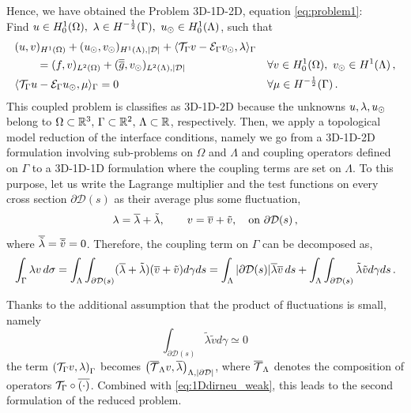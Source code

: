 \documentclass[r]{siamart171218}
\begin{document}
Hence, we have obtained the Problem 3D-1D-2D, equation 
\eqref{eq:problem1}: \\
Find $u \in H^1_0(\Omega), \ \lambda \in H^{-\frac 1 2}(\Gamma ),\ u_{\odot} \in H^1_0(\Lambda)$, such that
\begin{subequations}
\begin{align*}
&(u,v)_{H^1(\Omega)} + (u_{\odot},v_{\odot})_{H^1(\Lambda),|\mathcal{D}|} 
+ \langle {\mathcal{T}_\Gamma} v  - \mathcal{E}_\Gamma v_{\odot}, \lambda \rangle_\Gamma &&
\\
\nonumber
&\qquad= (f,v)_{L^2(\Omega)} +  (\overline{\overline{g}},v_{\odot})_{L^2(\Lambda),|\mathcal{D}|}
\quad &&\forall v \in H^1_0(\Omega), \ v_{\odot} \in H^1(\Lambda)\,,
\\
& \langle {\mathcal{T}_\Gamma} u - \mathcal{E}_\Gamma u_{\odot} , \mu \rangle_\Gamma = 0
\quad && \forall \mu \in H^{-\frac 1 2}(\Gamma)\,.
\end{align*}
\end{subequations}
This coupled problem is classifies as 3D-1D-2D because the unknowns $u,\lambda,u_{\odot}$ belong to 
$\Omega \subset \mathbb{R}^3,\, \Gamma \subset \mathbb{R}^2,\, \Lambda \subset \mathbb{R}$, respectively.
Then, we apply a topological model reduction of the interface conditions, namely we go from a 3D-1D-2D formulation
involving sub-problems on $\Omega$ and $\Lambda$ and coupling operators defined on $\Gamma$
to a 3D-1D-1D formulation where the coupling terms are set on $\Lambda$. 
To this purpose, let us write the Lagrange multiplier and the test functions on every cross section $\partial\mathcal{D}(s)$ as their average plus some fluctuation,
\begin{equation*}
\lambda=\overline{\lambda}+\tilde{\lambda}, \qquad v=\overline{v}+\tilde{v},
\quad \text{on} \ \partial\mathcal{D}(s)\,,
\end{equation*}
where $\overline{\tilde{\lambda}}=\overline{\tilde{v}}=0$. 
Therefore, the coupling term on $\Gamma$ can be decomposed as,
\begin{equation*}
\int_{\Gamma}\lambda v\, d\sigma
=\int _{\Lambda}  \int_{\partial\mathcal{D}(s)} (\overline{\lambda}+\tilde{\lambda})(\overline{v}+\tilde{v})d\gamma ds
= \int_{\Lambda}|\partial\mathcal{D}(s)| \overline{\lambda}\overline{v}\,ds+\int_{\Lambda}  \int_{\partial\mathcal{D}(s)} \tilde{\lambda}\tilde{v}d\gamma ds\,.
\end{equation*}

Thanks to the additional assumption that the product of fluctuations is small, namely
\begin{equation*}
\int_{\partial\mathcal{D}(s)} \tilde{\lambda}\tilde{v} d\gamma \simeq 0\,
\end{equation*}
the term $\left({\mathcal{T}_\Gamma} v, \lambda \right)_{\Gamma}$ becomes $\left( {\overline{\mathcal{T}}_\Lambda} v, \overline{\lambda} \right)_{\Lambda, |\partial\mathcal{D}|}$, where ${\overline{\mathcal{T}}_\Lambda}$ denotes the composition of operators ${\mathcal{T}_\Gamma} \circ \overline{(\cdot)}$.  Combined with \eqref{eq:1Ddirneu_weak}, this leads to the second formulation of the reduced problem.
\end{document}
